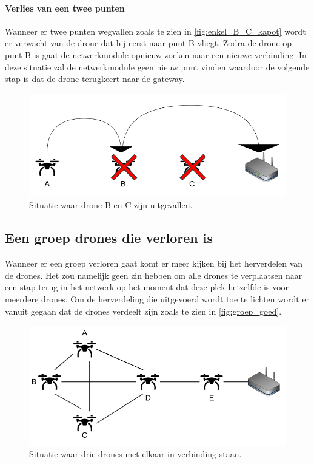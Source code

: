 \documentclass[a4paper, 11pt, oneside]{report}
\begin{document}
\paragraph{Verlies van een twee punten}
Wanneer er twee punten wegvallen zoals te zien in \autoref{fig:enkel_B_C_kapot} wordt er verwacht van de drone dat hij eerst naar punt B vliegt.
Zodra de drone op punt B is gaat de netwerkmodule opnieuw zoeken naar een nieuwe verbinding.
In deze situatie zal de netwerkmodule geen nieuw punt vinden waardoor de volgende stap is dat de drone terugkeert naar de gateway.  
\begin{figure}[H]
	\begin{center}\includegraphics[width=1\linewidth]{Afbeeldingen/droneopstelling_enkel_B_en_C_kapot.png}\end{center}
	\caption{Situatie waar drone B en C zijn uitgevallen.}
	\label{fig:enkel_B_C_kapot}
\end{figure}
 
\subsection{Een groep drones die verloren is}\label{sec:een-groep-drones-die-verloren-is}

Wanneer er een groep verloren gaat komt er meer kijken bij het herverdelen van de drones.
Het zou namelijk geen zin hebben om alle drones te verplaatsen naar een stap terug in het netwerk op het moment dat deze plek hetzelfde is voor meerdere drones.
Om de herverdeling die uitgevoerd wordt toe te lichten wordt er vanuit gegaan dat de drones verdeelt zijn zoals te zien in \autoref{fig:groep_goed}.

\begin{figure}[H]
	\begin{center}\includegraphics[width=1\linewidth]{Afbeeldingen/droneopstelling_Groep_goed.png}\end{center}
	\caption{Situatie waar drie drones met elkaar in verbinding staan.}
	\label{fig:groep_goed}
\end{figure} 
\end{document}
